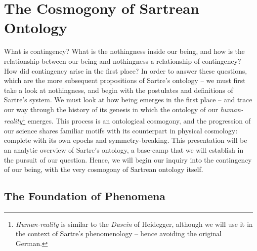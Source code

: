 \chapter{The Cosmogony of Sartrean Ontology}


What is contingency? What is the nothingness inside our being, and how is the relationship between our being and nothingness a relationship of contingency? How did contingency arise in the first place? In order to answer these questions, which are the more subsequent propositions of Sartre's ontology -- we must first take a look at nothingness, and begin with the postulates and definitions of Sartre's system. We must look at how being emerges in the first place -- and trace our way through the history of its genesis in which the ontology of our \emph{human-reality}\footnote{\emph{Human-reality} is similar to the \emph{Dasein} of Heidegger, although we will use it in the context of Sartre's phenomenology -- hence avoiding the original German.} emerges. This process is an ontological cosmogony, and the progression of our science shares familiar motifs with its counterpart in physical cosmology: complete with its own epochs and symmetry-breaking. This presentation will be an analytic overview of Sartre's ontology, a base-camp that we will establish in the pursuit of our question. Hence, we will begin our inquiry into the contingency of our being, with the very cosmogony of Sartrean ontology itself.

\section{The Foundation of Phenomena}

